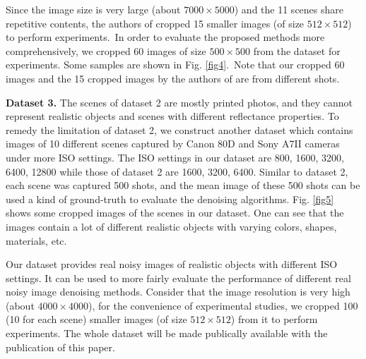 Since the image size is very large (about $7000\times5000$) and the 11 scenes share repetitive contents, the authors of \cite{crosschannel2016} cropped 15 smaller images (of size $512\times512$) to perform experiments.\ In order to evaluate the proposed methods more comprehensively, we cropped 60 images of size $500\times500$ from the dataset for experiments. Some samples are shown in Fig. \ref{fig4}.\ Note that our cropped 60 images and the 15 cropped images by the authors of \cite{crosschannel2016} are from different shots.


\textbf{Dataset 3.} The scenes of dataset 2 are mostly printed photos, and they cannot represent realistic objects and scenes with different reflectance properties. To remedy the limitation of dataset 2, we construct another dataset which contains images of 10 different scenes captured by Canon 80D and Sony A7II cameras under more ISO settings. The ISO settings in our dataset are 800, 1600, 3200, 6400, 12800 while those of dataset 2 are 1600, 3200, 6400. Similar to dataset 2, each scene was captured 500 shots, and the mean image of these 500 shots can be used a kind of ground-truth to evaluate the denoising algorithms. Fig. \ref{fig5} shows some cropped images of the scenes in our dataset. One can see that the images contain a lot of different realistic objects with varying colors, shapes, materials, etc. 

Our dataset provides real noisy images of realistic objects with different ISO settings. It can be used to more fairly evaluate the performance of different real noisy image denoising methods. Consider that the image resolution is very high (about $4000\times4000$), for the convenience of experimental studies, we cropped 100 (10 for each scene) smaller images (of size $512\times512$) from it to perform experiments. The whole dataset will be made publically available with the publication of this paper.


